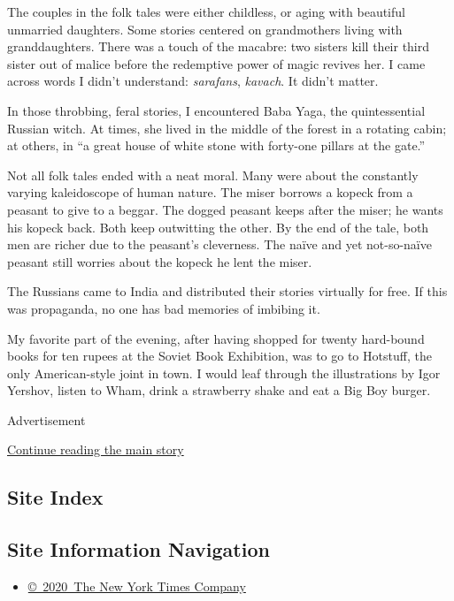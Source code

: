 The couples in the folk tales were either childless, or aging with
beautiful unmarried daughters. Some stories centered on grandmothers
living with granddaughters. There was a touch of the macabre: two
sisters kill their third sister out of malice before the redemptive
power of magic revives her. I came across words I didn't understand:
\emph{sarafans}, \emph{kavach}. It didn't matter.

In those throbbing, feral stories, I encountered Baba Yaga, the
quintessential Russian witch. At times, she lived in the middle of the
forest in a rotating cabin; at others, in ``a great house of white stone
with forty-one pillars at the gate.''

Not all folk tales ended with a neat moral. Many were about the
constantly varying kaleidoscope of human nature. The miser borrows a
kopeck from a peasant to give to a beggar. The dogged peasant keeps
after the miser; he wants his kopeck back. Both keep outwitting the
other. By the end of the tale, both men are richer due to the peasant's
cleverness. The naïve and yet not-so-naïve peasant still worries about
the kopeck he lent the miser.

The Russians came to India and distributed their stories virtually for
free. If this was propaganda, no one has bad memories of imbibing it.

My favorite part of the evening, after having shopped for twenty
hard-bound books for ten rupees at the Soviet Book Exhibition, was to go
to Hotstuff, the only American-style joint in town. I would leaf through
the illustrations by Igor Yershov, listen to Wham, drink a strawberry
shake and eat a Big Boy burger.

Advertisement

\protect\hyperlink{after-bottom}{Continue reading the main story}

\hypertarget{site-index}{%
\subsection{Site Index}\label{site-index}}

\hypertarget{site-information-navigation}{%
\subsection{Site Information
Navigation}\label{site-information-navigation}}

\begin{itemize}
\tightlist
\item
  \href{https://help.nytimes3xbfgragh.onion/hc/en-us/articles/115014792127-Copyright-notice}{©~2020~The
  New York Times Company}
\end{itemize}

